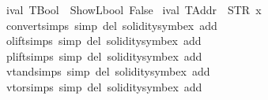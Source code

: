 \begin{isabellebody}
{\isacharbar}{\kern0pt}\ {\isachardoublequoteopen}ival\ TBool\ {\isacharequal}{\kern0pt}\ ShowL\isactrlsub b\isactrlsub o\isactrlsub o\isactrlsub l\ False{\isachardoublequoteclose}\isanewline
{\isacharbar}{\kern0pt}\ {\isachardoublequoteopen}ival\ TAddr\ {\isacharequal}{\kern0pt}\ STR\ {\isacharprime}{\kern0pt}{\isacharprime}{\kern0pt}{}x{}{}{}{}{}{}{}{}{}{}{}{}{}{}{}{}{}{}{}{}{}{}{}{}{}{}{}{}{}{}{}{}{}{}{}{}{}{}{}{}{\isacharprime}{\kern0pt}{\isacharprime}{\kern0pt}{\isachardoublequoteclose}\isanewline
\isanewline
{}\isamarkupfalse%
\ convert{\isachardot}{\kern0pt}simps\ {\isacharbrackleft}{\kern0pt}simp\ del{\isacharcomma}{\kern0pt}\ solidity{\isacharunderscore}{\kern0pt}symbex\ add{\isacharbrackright}{\kern0pt}\isanewline
{}\isamarkupfalse%
\ olift{\isachardot}{\kern0pt}simps\ {\isacharbrackleft}{\kern0pt}simp\ del{\isacharcomma}{\kern0pt}\ solidity{\isacharunderscore}{\kern0pt}symbex\ add{\isacharbrackright}{\kern0pt}\isanewline
{}\isamarkupfalse%
\ plift{\isachardot}{\kern0pt}simps\ {\isacharbrackleft}{\kern0pt}simp\ del{\isacharcomma}{\kern0pt}\ solidity{\isacharunderscore}{\kern0pt}symbex\ add{\isacharbrackright}{\kern0pt}\isanewline
{}\isamarkupfalse%
\ vtand{\isachardot}{\kern0pt}simps\ {\isacharbrackleft}{\kern0pt}simp\ del{\isacharcomma}{\kern0pt}\ solidity{\isacharunderscore}{\kern0pt}symbex\ add{\isacharbrackright}{\kern0pt}\isanewline
{}\isamarkupfalse%
\ vtor{\isachardot}{\kern0pt}simps\ {\isacharbrackleft}{\kern0pt}simp\ del{\isacharcomma}{\kern0pt}\ solidity{\isacharunderscore}{\kern0pt}symbex\ add{\isacharbrackright}{\kern0pt}\isanewline
%
\isadelimtheory
\isanewline
%
\endisadelimtheory
%
\isatagtheory
{}\isamarkupfalse%
%
\endisatagtheory
{\isafoldtheory}%
%
\isadelimtheory
%
\endisadelimtheory
%
\end{isabellebody}%
\endinput

